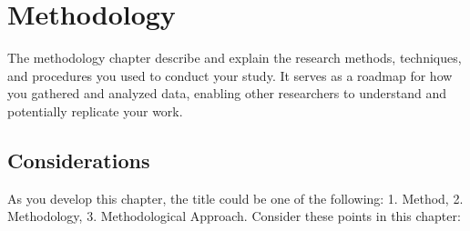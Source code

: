  
\chapter{Methodology}
 \label{chapter:rapproach}
 

 
The methodology chapter describe and explain the research methods, techniques, and procedures you used to conduct your study. It serves as a roadmap for how you gathered and analyzed data, enabling other researchers to understand and potentially replicate your work.



\section{Considerations}
As you develop this chapter, the title could be one of the following: 1. Method, 2. Methodology, 3. Methodological Approach.
Consider these points in this chapter:

